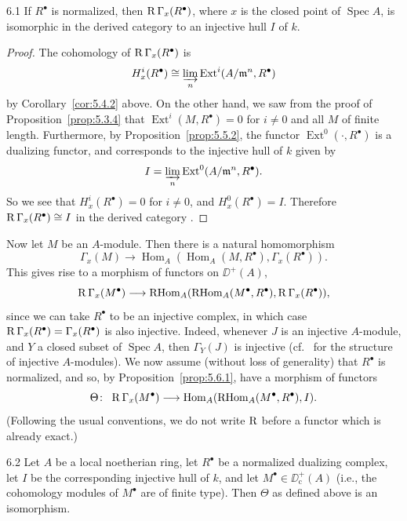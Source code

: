 \begin{bookproposition}{6.1}\label{prop:5.6.1}
If $R^\bullet$ is normalized, then $\operatorname{R}\Gamma_x(R^\bullet)$, where $x$ is the closed point of $\operatorname{Spec}A$, is isomorphic in the derived category to an injective hull $I$ of $k$.
\end{bookproposition}

\begin{proof}
The cohomology of $\operatorname{R}\Gamma_x(R^\bullet)$ is
\[
H_{x}^{i}(R^{\bullet})\cong \varinjlim_n\operatorname{Ext}^{i}(A/\mathfrak{m}^{n},R^{\bullet})
\]
by Corollary~\ref{cor:5.4.2} above. On the other hand, we saw from the proof of Proposition~\ref{prop:5.3.4} that $\operatorname{Ext}^{i}(M,R^\bullet)=0$ for $i\neq0$ and all $M$ of finite length. Furthermore, by Proposition~\ref{prop:5.5.2}, the functor $\operatorname{Ext}^{0}(\cdot,R^\bullet)$ is a dualizing functor, and corresponds to the injective hull of $k$ given by
\[
I = \varinjlim_n \operatorname{Ext}^{0}(A/\mathfrak{m}^{n}, R^{\bullet}).
\]
So we see that $H_{x}^{i}(R^\bullet)=0$ for $i\neq0$, and $H_{x}^{0}(R^\bullet)=I$. Therefore $\operatorname{R}\Gamma_x(R^\bullet)\cong I$ in the derived category .
\end{proof}

Now let $M$ be an $A$-module. Then there is a natural homomorphism
\[
\Gamma_x(M)\longrightarrow \operatorname{Hom}_A(\operatorname{Hom}_A(M,R^{\bullet}), \Gamma_x(R^{\bullet})).
\]
This gives rise to a morphism of functors on $\DD^+(A)$,
\[
\operatorname{R}\Gamma_x(M^{\bullet})\longrightarrow \operatorname{RHom}_A(\operatorname{RHom}_A(M^{\bullet}, R^{\bullet}), \operatorname{R}\Gamma_x(R^{\bullet})),
\]
since we can take $R^\bullet$ to be an injective complex, in which case $\operatorname{R}\Gamma_x(R^\bullet)=\Gamma_x(R^\bullet)$ is also injective. Indeed, whenever $J$ is an injective $A$-module, and $Y$ a closed subset of $\operatorname{Spec}A$, then $\Gamma_Y(J)$ is injective (cf.\  for the structure of injective $A$-modules). We now assume (without loss of generality) that $R^\bullet$ is normalized, and so, by Proposition~\ref{prop:5.6.1}, have a morphism of functors
\[
\Theta\colon\ \RR\Gamma_x(M^{\bullet})\longrightarrow \operatorname{Hom}_A(\RHom_A(M^{\bullet},R^{\bullet}), I).
\]
(Following the usual conventions, we do not write $\operatorname{R}$ before a functor which is already exact.)

\begin{booktheorem}{6.2}\label{thm:5.6.2}
Let $A$ be a local noetherian ring, let $R^\bullet$ be a normalized dualizing complex, let $I$ be the corresponding injective hull of $k$, and let $M^\bullet\in\DD^+_{\mathrm{c}}(A)$ (i.e., the cohomology modules of $M^\bullet$ are of finite type). Then $\Theta$ as defined above is an isomorphism.
\end{booktheorem}

